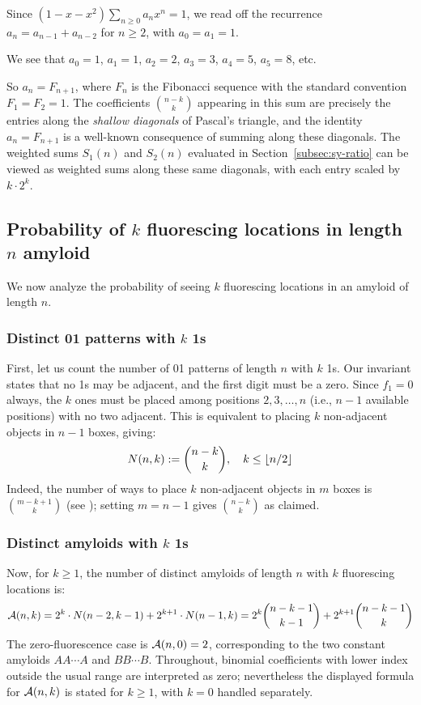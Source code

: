\documentclass[11pt]{article}
\DeclarePairedDelimiter\floor{\lfloor}{\rfloor}
\newcommand{\cA}{ {\cal A} }
\begin{document}
Since $(1-x-x^2)\sum_{n \ge 0} a_n x^n = 1$, we read off the recurrence $a_n = a_{n-1} + a_{n-2}$ for $n \ge 2$, with $a_0 = a_1 = 1$.

We see that $a_0 = 1$, $a_1 = 1$, $a_2 = 2$, $a_3 = 3$, $a_4 = 5$, $a_5 = 8$, etc.

So $a_n = F_{n+1}$, where $F_n$ is the Fibonacci sequence with the standard convention $F_1 = F_2 = 1$. The coefficients $\binom{n-k}{k}$ appearing in this sum are precisely the entries along the \textit{shallow diagonals} of Pascal's triangle, and the identity $a_n = F_{n+1}$ is a well-known consequence of summing along these diagonals. The weighted sums $S_1(n)$ and $S_2(n)$ evaluated in Section~\ref{subsec:sy-ratio} can be viewed as weighted sums along these same diagonals, with each entry scaled by $k \cdot 2^k$.

\subsection{Probability of $k$ fluorescing locations in length $n$ amyloid }

We now analyze the probability of seeing $k$ fluorescing locations in an amyloid of length $n$.


\subsubsection{Distinct 01 patterns with $k$ 1s}
First, let us count the number of 01 patterns of length $n$ with $k$ 1s. Our invariant states that no 1s may be adjacent, and the first digit must be a zero. Since $f_1 = 0$ always, the $k$ ones must be placed among positions $2, 3, \ldots, n$ (i.e., $n - 1$ available positions) with no two adjacent. This is equivalent to placing $k$ non-adjacent objects in $n - 1$ boxes, giving:
\[
N(n,k) := \binom{n-k}{k}, \quad k \leq \floor{n/2}
\]
Indeed, the number of ways to place $k$ non-adjacent objects in $m$ boxes is $\binom{m-k+1}{k}$ (see \cite[Exercise~1.34]{stanley2012}); setting $m = n - 1$ gives $\binom{n-k}{k}$ as claimed.


\subsubsection{Distinct amyloids with $k$ 1s}
Now, for $k \ge 1$, the number of distinct amyloids of length $n$ with $k$ fluorescing locations is:
\[
    \cA(n,k) = 2^k \cdot N(n-2,k-1) + 2^{k+1}  \cdot N(n-1,k) = 2^k \binom{n-k-1}{k-1} + 2^{k+1} \binom{n-k-1}{k}
\]
The zero-fluorescence case is $\cA(n,0) = 2$, corresponding to the two constant amyloids $AA\cdots A$ and $BB\cdots B$.
Throughout, binomial coefficients with lower index outside the usual range are interpreted as zero; nevertheless the displayed formula for $\cA(n,k)$ is stated for $k \ge 1$, with $k=0$ handled separately.
\end{document}
